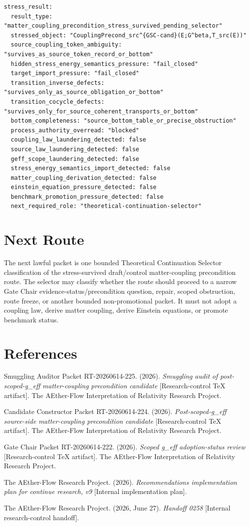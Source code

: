 \documentclass[11pt]{article}
\begin{document}
\begin{verbatim}
stress_result:
  result_type: "matter_coupling_precondition_stress_survived_pending_selector"
  stressed_object: "CouplingPrecond_src^{GSC-cand}(E;G^beta,T_src(E))"
  source_coupling_token_ambiguity: "survives_as_source_token_record_or_bottom"
  hidden_stress_energy_semantics_pressure: "fail_closed"
  target_import_pressure: "fail_closed"
  transition_inverse_defects: "survives_only_as_source_obligation_or_bottom"
  transition_cocycle_defects: "survives_only_for_source_coherent_transports_or_bottom"
  bottom_completeness: "source_bottom_table_or_precise_obstruction"
  process_authority_overread: "blocked"
  coupling_law_laundering_detected: false
  source_law_laundering_detected: false
  geff_scope_laundering_detected: false
  stress_energy_semantics_import_detected: false
  matter_coupling_derivation_detected: false
  einstein_equation_pressure_detected: false
  benchmark_promotion_pressure_detected: false
  next_required_role: "theoretical-continuation-selector"
\end{verbatim}

\section{Next Route}

The next lawful packet is one bounded Theoretical Continuation Selector
classification of the stress-survived draft/control matter-coupling
precondition route. The selector may classify whether the route should
proceed to a narrow Gate Chair evidence-status/precondition question, repair,
scoped obstruction, route freeze, or another bounded non-promotional packet.
It must not adopt a coupling law, derive matter coupling, derive Einstein
equations, or promote benchmark status.

\section*{References}

Smuggling Auditor Packet RT-20260614-225. (2026). \textit{Smuggling audit of
post-scoped-g\_eff matter-coupling precondition candidate} [Research-control
TeX artifact]. The AEther-Flow Interpretation of Relativity Research Project.

Candidate Constructor Packet RT-20260614-224. (2026). \textit{Post-scoped-g\_eff
source-side matter-coupling precondition candidate} [Research-control TeX
artifact]. The AEther-Flow Interpretation of Relativity Research Project.

Gate Chair Packet RT-20260614-222. (2026). \textit{Scoped g\_eff adoption-status
review} [Research-control TeX artifact]. The AEther-Flow Interpretation of
Relativity Research Project.

The AEther-Flow Research Project. (2026). \textit{Recommendations
implementation plan for continue research, v9} [Internal implementation plan].

The AEther-Flow Research Project. (2026, June 27). \textit{Handoff 0258}
[Internal research-control handoff].
\end{document}
